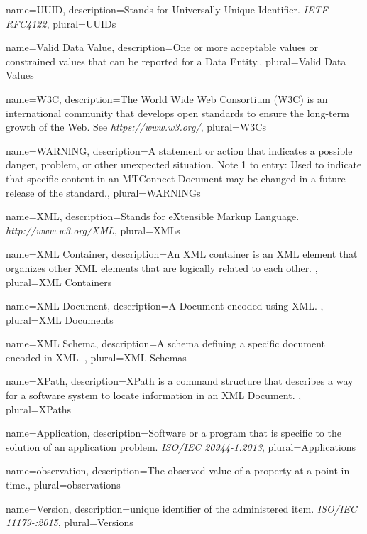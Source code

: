 {
    name={UUID},
	description={Stands for Universally Unique Identifier.  \textit{IETF RFC4122}},
	plural={UUIDs}
}

{
    name={Valid Data Value},
	description={One or more acceptable values or constrained values that can be reported for a \gls{Data Entity}.},
	plural={Valid Data Values}
}

{
    name={W3C},
	description={The World Wide Web Consortium (W3C) is an international community that develops open standards to ensure the long-term growth of the Web. See \textit{https://www.w3.org/}},
	plural={W3Cs}
}

{
    name={WARNING},
	description={A statement or action that indicates a possible danger, problem, or other unexpected situation.
Note 1 to entry: Used to indicate that specific content in an \gls{MTConnect Document} may be changed in a future release of the standard.},
	plural={WARNINGs}
}

{
    name={XML},
	description={Stands for eXtensible Markup Language. \textit{http://www.w3.org/XML}},
	plural={XMLs}
}

{
    name={XML Container},
	description={An XML container is an XML element that \glspl{organize} other XML elements that are logically related to each other. },
	plural={XML Containers}
}

{
    name={XML Document},
	description={A \gls{Document} encoded using XML.
},
	plural={XML Documents}
}

{
    name={XML Schema},
	description={A \gls{schema} defining a specific document encoded in XML.
},
	plural={XML Schemas}
}

{
    name={XPath},
	description={\gls{XPath} is a command structure that describes a way for a software system to locate information in an \gls{XML Document}. },
	plural={XPaths}
}

{
    name={Application},
	description={Software or a program that is specific to the solution of an application problem.
\textit{ISO/IEC 20944-1:2013}},
	plural={Applications}
}

{
    name={observation},
	description={The observed value of a property at a point in time.},
	plural={observations}
}

{
    name={Version},
	description={unique identifier of the administered item. \textit{ISO/IEC 11179-:2015}},
	plural={Versions}
}

